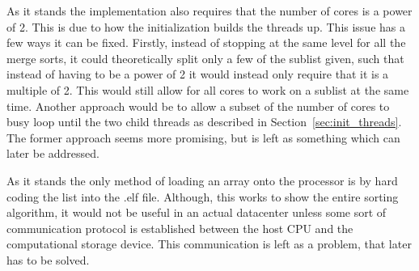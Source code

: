 As it stands the implementation also requires that the number of cores is a
power of 2. This is due to how the initialization builds the threads up. This
issue has a few ways it can be fixed. Firstly, instead of stopping at the same
level for all the merge sorts, it could theoretically split only a few of the
sublist given, such that instead of having to be a power of 2 it would instead
only require that it is a multiple of 2. This would still allow for all cores to
work on a sublist at the same time. Another approach would be to allow a subset
of the number of cores to busy loop until the two child threads as described in
Section~\ref{sec:init_threads}. The former approach seems more promising, but is
left as something which can later be addressed.

As it stands the only method of loading an array onto the processor is by hard
coding the list into the .elf file. Although, this works to show the entire
sorting algorithm, it would not be useful in an actual datacenter unless some
sort of communication protocol is established between the host CPU and the
computational storage device. This communication is left as a problem, that
later has to be solved.




